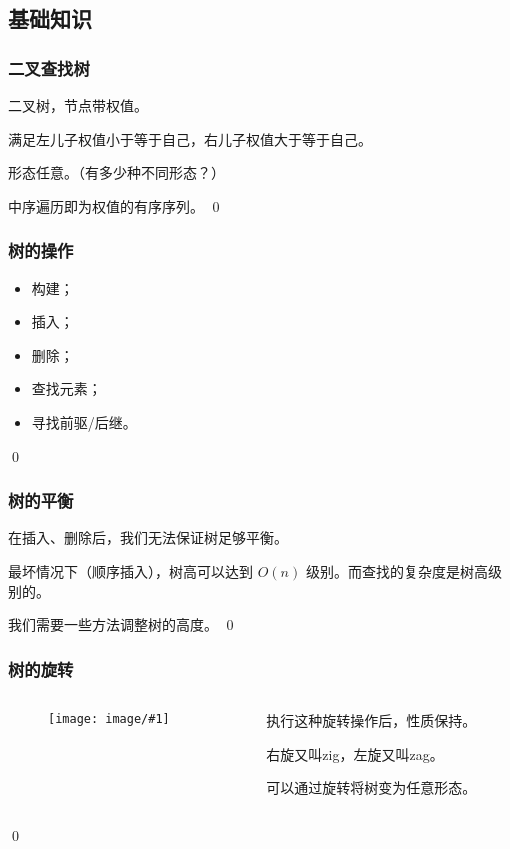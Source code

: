 \documentclass[9pt,dvipsnames,table]{beamer}
\newcommand{\graph}[2]
{\begin{figure}[h]
	\centering
	\texttt{[image: image/\#1]}
\end{figure}}
\newenvironment{qedframe}{%
	\begin{frame}[environment=qedqedframe]%
	}{%
	\qed
	\end{frame}%
}
\begin{document}
\subsection{基础知识}
\begin{qedframe}
	\frametitle{二叉查找树}
	二叉树，节点带权值。
	
	满足左儿子权值小于等于自己，右儿子权值大于等于自己。\pause
	
	形态任意。（有多少种不同形态？）\pause
	
	中序遍历即为权值的有序序列。
\end{qedframe}
\begin{qedframe}
	\frametitle{树的操作}
	\begin{itemize}
		\item 构建；
		\item 插入；
		\item 删除；
		\item 查找元素；
		\item 寻找前驱/后继。
	\end{itemize}
\end{qedframe}
\begin{qedframe}
	\frametitle{树的平衡}
	在插入、删除后，我们无法保证树足够平衡。
	
	最坏情况下（顺序插入），树高可以达到 $ O(n) $ 级别。而查找的复杂度是树高级别的。
	
	我们需要一些方法调整树的高度。
\end{qedframe}
\begin{qedframe}
	\frametitle{树的旋转}
	\begin{columns}
		\begin{column}{0.5\textwidth}
			\graph{Tree_rotation.png}{}
		\end{column}
		\begin{column}{0.5\textwidth}
			执行这种旋转操作后，性质保持。
			
			右旋又叫zig，左旋又叫zag。
			
			可以通过旋转将树变为任意形态。
		\end{column}
	\end{columns}
\end{qedframe}
\end{document}
